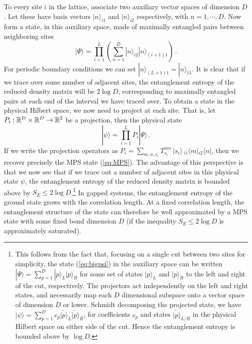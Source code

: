 \documentclass[10pt, oneside]{book}
\def\be{\begin{equation}}
\def\ee{\end{equation}}
\def\R{{{\Bbb R}}}
\begin{document}
\begin{doublespace}
To every site $i$ in the lattice, associate two auxiliary vector spaces of dimension $D$. Let these have basis vectors $|n\rangle_{i1}$ and $|n\rangle_{i2}$ respectively, with $n=1, \cdots , D$. Now form a state, in this auxiliary space, made of maximally entangled pairs between neighboring sites
\be\label{eq:bigpsi}
|\Psi\rangle = \prod_{i=1}^L \left(\sum_{n=1}^D |n\rangle_{i2}|n\rangle_{(i+1)1} \right) \,.
\ee
For periodic boundary conditions we can set $|n\rangle_{(L+1)1} = |n\rangle_{11}$. It is clear that if we trace over some number of adjacent sites, the entanglement entropy of the reduced density matrix will be $2 \log D$, corresponding to maximally entangled pairs at each end of the interval we have traced over. To obtain a state in the physical Hilbert space, we now need to project at each site. That is, let $P_i: \R^D \times \R^D \to \R^2$ be a projection, then the physical state
\be
|\psi\rangle = \prod_{i=1}^L P_i | \Psi\rangle \,.
\ee
If we write the projection operators as $P_i = \sum_{m,n,s_i} T^{mn}_{s_i} \, |s_i \rangle \, {}_{i1}\langle m | {}_{i2}\langle n |$, then we recover precisely the MPS state (\ref{eq:MPS}). The advantage of this perspective is that we now see that if we trace out a number of adjacent sites in this physical state $\psi$, the entanglement entropy of the reduced density matrix is bounded above by $S_E \leq 2 \log D$.\footnote{This follows from the fact that, focusing on a single cut between two sites for simplicity, the state (\ref{eq:bigpsi}) in the auxiliary space can be written $|\Psi\rangle = \sum_{p=1}^D |p\rangle_L |p\rangle_R$ for some set of states $|p\rangle_L$ and $|p\rangle_R$ to the left and right of the cut, respectively. The projectors act independently on the left and right states, and necessarily map each $D$ dimensional subspace onto a vector space of dimension $D$ or lower. Schmidt decomposing the projected state, we have $|\psi\rangle = \sum_{p=1}^D c_p \widetilde{|p\rangle}_L \widetilde{|p\rangle}_R$, for coefficients $c_p$ and states $\widetilde{|p\rangle}_{L/R}$ in the physical Hilbert space on either side of the cut. Hence the entanglement entropy is bounded above by $\log D$.} In gapped systems, the entanglement entropy of the ground state grows with the correlation length. At a fixed correlation length, the entanglement structure of the state can therefore be well approximated by a MPS state with some fixed bond dimension $D$ (if the inequality $S_E \leq 2 \log D$ is approximately saturated).


\end{doublespace}
\end{document}
